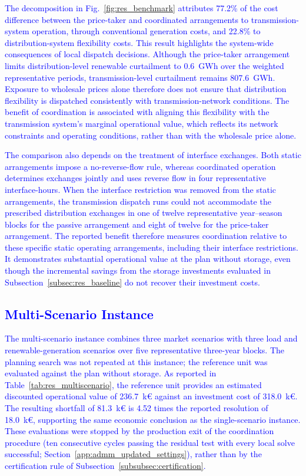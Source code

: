 \documentclass[preprint,12pt]{elsarticle}
\begin{document}
\textcolor{blue}{
    The decomposition in Fig.~\ref{fig:res_benchmark} attributes 77.2\% of the cost difference between the price-taker and coordinated arrangements to transmission-system operation, through conventional generation costs, and 22.8\% to distribution-system flexibility costs. This result highlights the system-wide consequences of local dispatch decisions. Although the price-taker arrangement limits distribution-level renewable curtailment to 0.6~GWh over the weighted representative periods, transmission-level curtailment remains 807.6~GWh. Exposure to wholesale prices alone therefore does not ensure that distribution flexibility is dispatched consistently with transmission-network conditions. The benefit of coordination is associated with aligning this flexibility with the transmission system's marginal operational value, which reflects its network constraints and operating conditions, rather than with the wholesale price alone.
}

\textcolor{blue}{
    The comparison also depends on the treatment of interface exchanges. Both static arrangements impose a no-reverse-flow rule, whereas coordinated operation determines exchanges jointly and uses reverse flow in four representative interface-hours. When the interface restriction was removed from the static arrangements, the transmission dispatch runs could not accommodate the prescribed distribution exchanges in one of twelve representative year--season blocks for the passive arrangement and eight of twelve for the price-taker arrangement. The reported benefit therefore measures coordination relative to these specific static operating arrangements, including their interface restrictions. It demonstrates substantial operational value at the plan without storage, even though the incremental savings from the storage investments evaluated in Subsection~\ref{subsec:res_baseline} do not recover their investment costs.
}

\subsection{\textcolor{blue}{Multi-Scenario Instance}}
\label{subsec:res_multiscenario}

\textcolor{blue}{
    The multi-scenario instance combines three market scenarios with three load and renewable-generation scenarios over five representative three-year blocks. 
    The planning search was not repeated at this instance; the reference unit was evaluated against the plan without storage.
    As reported in Table~\ref{tab:res_multiscenario}, the reference unit provides an estimated discounted operational value of 236.7~k\euro{} against an investment cost of 318.0~k\euro{}. The resulting shortfall of 81.3~k\euro{} is 4.52 times the reported resolution of 18.0~k\euro{}, supporting the same economic conclusion as the single-scenario instance. These evaluations were stopped by the production exit of the coordination procedure (ten consecutive cycles passing the residual test with every local solve successful; Section~\ref{app:admm_updated_settings}), rather than by the certification rule of Subsection~\ref{subsubsec:certification}.
}
\end{document}
